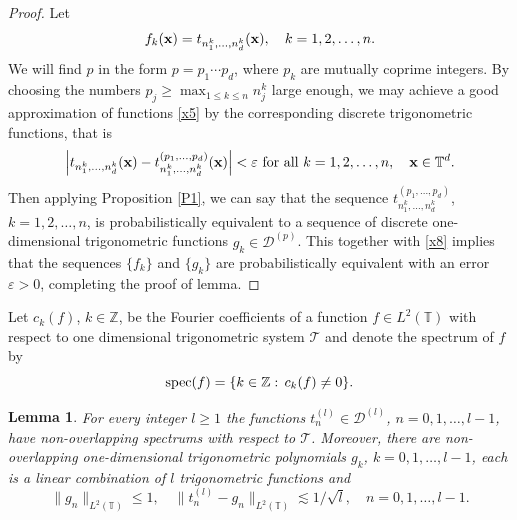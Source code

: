 \documentclass[12pt,reqno,fleqn]{amsart}
\theoremstyle{plain} %
\newtheorem{lemma}{Lemma}[section]
\theoremstyle{remark}
\def\x{\ensuremath{\textbf x}}
\def\spec{{\rm spec}}
\def\ZZ{\ensuremath{\mathbb Z}}
\def\ZD{\ensuremath{\mathscr D}}
\def\ZT{\ensuremath{\mathbb T}}
\def\zT{\ensuremath{\mathscr T}}
\theoremstyle{plain}
\numberwithin{equation}{section}
\newcommand {\e }[1]{\eqref{#1}}
\newcommand {\pro }[1]{Proposition \ref{#1}}
\begin{document}
\begin{proof}
	 Let
	\begin{equation}\label{x5}
		f_k(\x)=t_{n_1^k,\ldots,n_d^k}(\x),\quad k=1,2,\ldots,n.
	\end{equation}
We will find $p$ in the form $p=p_1\cdots p_d$, where $p_k$ are mutually coprime integers. By choosing the numbers $p_j\ge \max_{1\le k\le n}n_j^k$ large enough, we may achieve a good approximation of functions  \e{x5} by the corresponding discrete trigonometric functions, that is
\begin{equation}\label{x8}
\left|t_{n_1^k,\ldots,n_d^k}(\x)-t^{(p_1,\ldots,p_d)}_{n_1^k,\ldots,n_d^k}(\x)\right|<\varepsilon \text{ for all }k=1,2,\ldots,n, \quad \x\in \ZT^d.
\end{equation}
Then applying \pro{P1}, we can say that the sequence $t^{(p_1,\ldots,p_d)}_{n_1^k,\ldots,n_d^k}$, $k=1,2,\ldots,n$, is probabilistically equivalent to a sequence of discrete one-dimensional trigonometric functions $g_k\in \ZD^{(p)}$. This together with \e{x8} implies that the sequences $\{f_k\}$ and $\{g_k\}$ are probabilistically equivalent with an error $\varepsilon>0$, completing the proof of lemma.
\end{proof}
Let $c_k(f)$, $k\in \ZZ$, be the Fourier coefficients of a function $f\in L^2(\ZT)$ with respect to one dimensional trigonometric system $\zT$ and denote the spectrum of $f$ by
\begin{equation*}
\spec(f)=\{k\in \ZZ:\, c_k(f)\neq 0\}.
\end{equation*}
\begin{lemma}\label{L2}
For every integer $l\ge  1$ the functions $t_n^{(l)}\in \ZD^{(l)}$, $n=0,1,\ldots,l-1$, have non-overlapping spectrums with respect to $\zT$. Moreover,  there are  non-overlapping one-dimensional trigonometric polynomials $g_k$, $k=0,1,\ldots,l-1$, each is a linear combination of $l$ trigonometric functions and 
\begin{equation*}
	\|g_n\|_{L^2(\ZT)}\le 1,\quad \|t_n^{(l)}-g_n\|_{L^2(\ZT)}\lesssim 1/\sqrt{l}, \quad n=0,1,\ldots,l-1.
\end{equation*}
\end{lemma}
\end{document}
